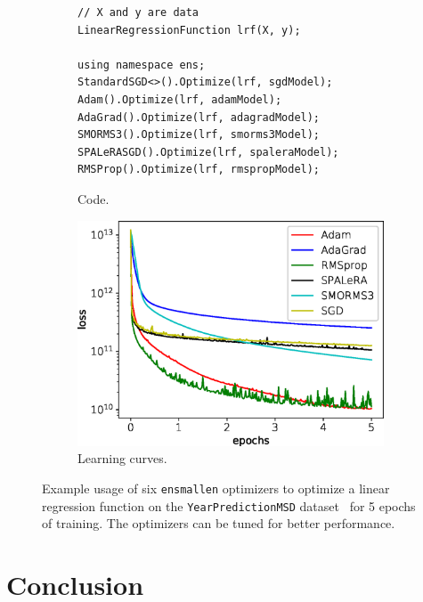 \documentclass{article}
\begin{document}
\begin{figure}[b!]
\centering
\begin{subfigure}[b]{0.49\textwidth}
\begin{verbatim}
// X and y are data
LinearRegressionFunction lrf(X, y);

using namespace ens;
StandardSGD<>().Optimize(lrf, sgdModel);
Adam().Optimize(lrf, adamModel);
AdaGrad().Optimize(lrf, adagradModel);
SMORMS3().Optimize(lrf, smorms3Model);
SPALeRASGD().Optimize(lrf, spaleraModel);
RMSProp().Optimize(lrf, rmspropModel);
\end{verbatim}
\caption{Code.}
\end{subfigure}
\begin{subfigure}[b]{0.49\textwidth}
  \centering
  \includegraphics[width=\textwidth,height=0.6\textwidth]{experiments/learning_curves_crop.eps}
\caption{Learning curves.}
\end{subfigure}
\caption{\footnotesize
Example usage of six \texttt{\small ensmallen} optimizers to optimize a
linear regression function on the \texttt{\small YearPredictionMSD}
dataset~\cite{ucimlrepository} for 5 epochs of training.  The optimizers can be
tuned for better performance.}
\label{fig:learning_curve}
\vspace*{-1ex}
\end{figure}

\vspace*{-0.3em}
\section{Conclusion}
\vspace*{-0.5em}
\end{document}
